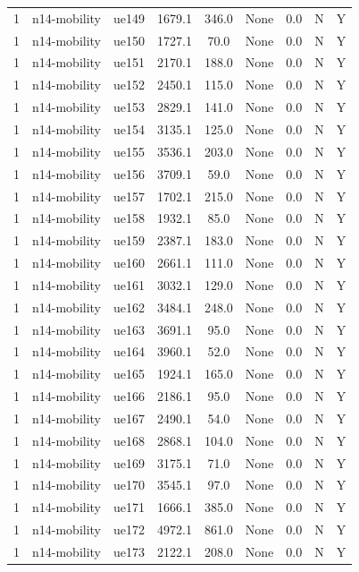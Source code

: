 \begin{table}[ht]
\begin{tabular}{|c|c|c|c|c|c|c|c|c|}
1 & n14-mobility & ue149 & 1679.1 & 346.0 & None & 0.0 & N & Y \\
1 & n14-mobility & ue150 & 1727.1 & 70.0 & None & 0.0 & N & Y \\
1 & n14-mobility & ue151 & 2170.1 & 188.0 & None & 0.0 & N & Y \\
1 & n14-mobility & ue152 & 2450.1 & 115.0 & None & 0.0 & N & Y \\
1 & n14-mobility & ue153 & 2829.1 & 141.0 & None & 0.0 & N & Y \\
1 & n14-mobility & ue154 & 3135.1 & 125.0 & None & 0.0 & N & Y \\
1 & n14-mobility & ue155 & 3536.1 & 203.0 & None & 0.0 & N & Y \\
1 & n14-mobility & ue156 & 3709.1 & 59.0 & None & 0.0 & N & Y \\
1 & n14-mobility & ue157 & 1702.1 & 215.0 & None & 0.0 & N & Y \\
1 & n14-mobility & ue158 & 1932.1 & 85.0 & None & 0.0 & N & Y \\
1 & n14-mobility & ue159 & 2387.1 & 183.0 & None & 0.0 & N & Y \\
1 & n14-mobility & ue160 & 2661.1 & 111.0 & None & 0.0 & N & Y \\
1 & n14-mobility & ue161 & 3032.1 & 129.0 & None & 0.0 & N & Y \\
1 & n14-mobility & ue162 & 3484.1 & 248.0 & None & 0.0 & N & Y \\
1 & n14-mobility & ue163 & 3691.1 & 95.0 & None & 0.0 & N & Y \\
1 & n14-mobility & ue164 & 3960.1 & 52.0 & None & 0.0 & N & Y \\
1 & n14-mobility & ue165 & 1924.1 & 165.0 & None & 0.0 & N & Y \\
1 & n14-mobility & ue166 & 2186.1 & 95.0 & None & 0.0 & N & Y \\
1 & n14-mobility & ue167 & 2490.1 & 54.0 & None & 0.0 & N & Y \\
1 & n14-mobility & ue168 & 2868.1 & 104.0 & None & 0.0 & N & Y \\
1 & n14-mobility & ue169 & 3175.1 & 71.0 & None & 0.0 & N & Y \\
1 & n14-mobility & ue170 & 3545.1 & 97.0 & None & 0.0 & N & Y \\
1 & n14-mobility & ue171 & 1666.1 & 385.0 & None & 0.0 & N & Y \\
1 & n14-mobility & ue172 & 4972.1 & 861.0 & None & 0.0 & N & Y \\
1 & n14-mobility & ue173 & 2122.1 & 208.0 & None & 0.0 & N & Y \\

\end{tabular}
\end{table}
